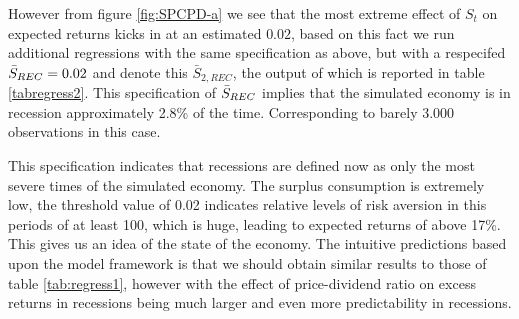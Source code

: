 However from figure \ref{fig:SPCPD-a} we see that the most extreme effect of $S_t$ on expected returns kicks in at an estimated $0.02$, based on this fact we run additional regressions with the same specification as above, but with a respecifed $\Bar{S}_{REC}=0.02$ and denote this $\bar{S}_{2,REC}$, the output of which is reported in table \ref{tabregress2}. This specification of $\Bar{S}_{REC}$ implies that the simulated economy is in recession approximately 2.8\% of the time. Corresponding to barely 3.000 observations in this case. \\
\newline


This specification indicates that recessions are defined now as only the most severe times of the simulated economy. The surplus consumption is extremely low, the threshold value of 0.02 indicates relative levels of risk aversion in this periods of at least 100, which is huge, leading to expected  returns of above 17\%. This gives us an idea of the state of the economy. The intuitive predictions based upon the model framework is that we should obtain similar results to those of table \ref{tab:regress1}, however with the effect of price-dividend ratio on excess returns in recessions being much larger and even more predictability in recessions.





